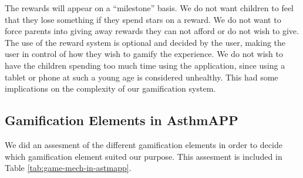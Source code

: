 The rewards will appear on a ``milestone'' basis. We do not want children to feel that they lose something if they spend stars on a reward. We do not want to force parents into giving away rewards they can not afford or do not wish to give. The use of the reward system is optional and decided by the user, making the user in control of how they wish to gamify the experience. 
We do not wish to have the children spending too much time using the application, since using a tablet or phone at such a young age is considered unhealthy. This had some implications on the complexity of our gamification system. 


\subsection{Gamification Elements in AsthmAPP}
\label{sec:combininggamemechanismsinasthmapp}

We did an assesment of the different gamification elements in order to decide which gamification element suited our purpose. This assesment is included in Table \ref{tab:game-mech-in-astmapp}. 

